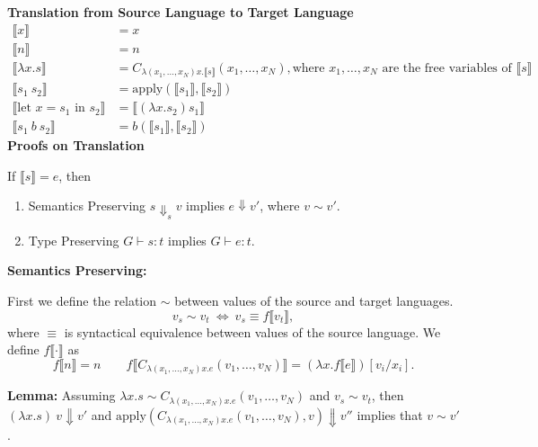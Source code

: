 \documentclass[9pt]{article}
\newcommand*{\br}[1]{\llbracket{#1}\rrbracket}
\newcommand*{\apply}{\text{apply}}
\begin{document}
\textbf{Translation from Source Language to Target Language}
\begin{align*}
    \br{x} &= x\\
    \br{n} &= n\\
    \br{\lambda x.s} &= C_{\lambda (x_1, \dots, x_N)x.\br{s}}(x_1, \dots, x_N), \text{where $x_1, \dots, x_N$ are the free variables of $\br{s}$}\\
    \br{s_1\ s_2} &= \apply (\br{s_1}, \br{s_2})\\
    \br{\text{let $x = s_1$ in $s_2$}} &= \br{(\lambda x.s_2) s_1}\\
    \br{s_1\ b\ s_2} &= b(\br{s_1},\br{s_2})
\end{align*}
\textbf{Proofs on Translation}

If $\br{s} = e$, then
\begin{enumerate}[label= (\alph*)]
    \item \lbrack{}Semantics Preserving\rbrack{} $s \Downarrow_s v$ implies $e \Downarrow v'$, where $v \sim v'$.
    \item \lbrack{}Type Preserving\rbrack{} $G \vdash s:t$ implies $G \vdash e:t$.
\end{enumerate}

\textbf{Semantics Preserving:}

First we define the relation $\sim$ between values of the source and target languages. $$v_s \sim v_t\ \Leftrightarrow\ v_s \equiv f\br{v_t},$$ where $\equiv$ is syntactical equivalence between values of the source language. We define $f\br{\cdot}$ as $$f\br{n} = n \qquad f\br{C_{\lambda (x_1, \dots, x_N)x.e}(v_1, \dots, v_N)} = (\lambda x.f\br{e})[v_i/x_i].$$

\textbf{Lemma:} Assuming $\lambda x.s \sim C_{\lambda (x_1, \dots, x_N)x.e}(v_1, \dots, v_N)$ and $v_s \sim v_t$, then $(\lambda x.s)\ v \Downarrow v'$ and $\text{apply}(C_{\lambda (x_1, \dots, x_N)x.e}(v_1, \dots, v_N), v) \Downarrow v''$ implies that $v \sim v'$. 
\end{document}
